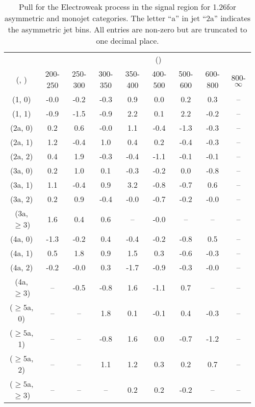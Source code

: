 \begin{table}[h!]
\tiny
\centering
\caption{Pull for the Electroweak process in the signal region for 1.26\ifb for asymmetric and monojet categories. The letter ``a'' in jet \eg ``2a''  indicates the asymmetric jet bins. All entries are non-zero but are truncated to one decimal place.\label{tab:pullsep_ewk_sig_asym}}
\begin{tabular}
{ccccccccc}
	\hline\hline
&	& \multicolumn{8}{c}{\scalht (\gev)} \\ 
	 (\njet,  \nb) & 200-250 & 250-300 & 300-350 & 350-400 & 400-500 & 500-600 & 600-800 & 800-$\infty$ \\ [0.8ex] 
\hline
	(1, 0) & -0.0 & -0.2 & -0.3 & 0.9 & 0.0 & 0.2 & 0.3 & -- \\[0.5ex] 
	(1, 1) & -0.9 & -1.5 & -0.9 & 2.2 & 0.1 & 2.2 & -0.2 & -- \\[0.5ex] 
	(2a, 0) & 0.2 & 0.6 & -0.0 & 1.1 & -0.4 & -1.3 & -0.3 & -- \\[0.5ex] 
	(2a, 1) & 1.2 & -0.4 & 1.0 & 0.4 & 0.2 & -0.4 & -0.3 & -- \\[0.5ex] 
	(2a, 2) & 0.4 & 1.9 & -0.3 & -0.4 & -1.1 & -0.1 & -0.1 & -- \\[0.5ex] 
	(3a, 0) & 0.2 & 1.0 & 0.1 & -0.3 & -0.2 & 0.0 & -0.8 & -- \\[0.5ex] 
	(3a, 1) & 1.1 & -0.4 & 0.9 & 3.2 & -0.8 & -0.7 & 0.6 & -- \\[0.5ex] 
	(3a, 2) & 0.2 & 0.9 & -0.4 & -0.0 & -0.7 & -0.2 & -0.0 & -- \\[0.5ex] 
	(3a, $\ge3$) & 1.6 & 0.4 & 0.6 & -- & -0.0 & -- & -- & -- \\[0.5ex] 
	(4a, 0) & -1.3 & -0.2 & 0.4 & -0.4 & -0.2 & -0.8 & 0.5 & -- \\[0.5ex] 
	(4a, 1) & 0.5 & 1.8 & 0.9 & 1.5 & 0.3 & -0.6 & -0.3 & -- \\[0.5ex] 
	(4a, 2) & -0.2 & -0.0 & 0.3 & -1.7 & -0.9 & -0.3 & -0.0 & -- \\[0.5ex] 
	(4a, $\ge3$) & -- & -0.5 & -0.8 & 1.6 & -1.1 & 0.7 & -- & -- \\[0.5ex] 
	($\ge5$a, 0) & -- & -- & 1.8 & 0.1 & -0.1 & 0.4 & -0.3 & -- \\[0.5ex] 
	($\ge5$a, 1) & -- & -- & -0.8 & 1.6 & 0.0 & -0.7 & -1.2 & -- \\[0.5ex] 
	($\ge5$a, 2) & -- & -- & 1.1 & 1.2 & 0.3 & 0.2 & 0.7 & -- \\[0.5ex] 
	($\ge5$a, $\ge3$) & -- & -- & -- & 0.2 & 0.2 & -0.2 & -- & -- \\[0.5ex] 
	\hline
	\hline
\end{tabular}
\end{table}
